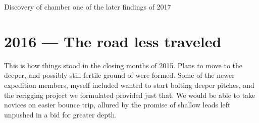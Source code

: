 	\begin{marginfigure}
	\checkoddpage \ifoddpage \forcerectofloat \else \forceversofloat \fi
	\centering
  	\caption{Discovery of \protect{} chamber one of the later findings of 2017 }
	\end{marginfigure}

\section{2016 --- The road less traveled}
This is how things stood in the closing months of 2015. Plans to move to the deeper, and possibly still fertile ground of  were formed. Some of the newer expedition members, myself included wanted to start bolting deeper pitches, and the rerigging project we formulated provided just that. We would be able to take novices on easier bounce trip, allured by the promise of shallow leads left unpushed in a bid for greater depth.

